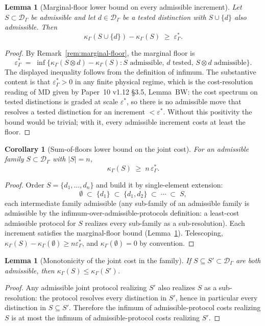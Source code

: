 \documentclass[11pt]{article}
\newtheorem{lemma}[theorem]{Lemma}
\newtheorem{corollary}[theorem]{Corollary}
\begin{document}
\begin{lemma}[Marginal-floor lower bound on every admissible increment]
\label{lem:marginal-floor-on-joint-cost}
Let $S\subset\mathcal D_\Gamma$ be admissible and let $d\in\mathcal D_\Gamma$ be a tested distinction with $S\cup\{d\}$ also admissible.  Then
\[
    \kappa_\Gamma(S\cup\{d\}) - \kappa_\Gamma(S)
    \;\ge\;
    \varepsilon^*_\Gamma.
\]
\end{lemma}
\begin{proof}
By Remark~\ref{rem:marginal-floor}, the marginal floor is
\[
    \varepsilon^*_\Gamma
    \;=\;
    \inf\bigl\{\kappa_\Gamma(S\otimes d) - \kappa_\Gamma(S) :
            S \text{ admissible},\, d \text{ tested},\,
            S\otimes d \text{ admissible}\bigr\}.
\]
The displayed inequality follows from the definition of infimum.  The substantive content is that $\varepsilon^*_\Gamma > 0$ in any finite physical regime, which is the cost-resolution reading of MD given by Paper~10 v1.12 \S3.5, Lemma~BW: the cost spectrum on tested distinctions is graded at scale $\varepsilon^*$, so there is no admissible move that resolves a tested distinction for an increment $< \varepsilon^*$.  Without this positivity the bound would be trivial; with it, every admissible increment costs at least the floor.
\end{proof}

\begin{corollary}[Sum-of-floors lower bound on the joint cost]
\label{cor:sum-of-floors-lower-bound}
For an admissible family $S\subset\mathcal D_\Gamma$ with $|S|=n$,
\[
    \kappa_\Gamma(S) \;\ge\; n\,\varepsilon^*_\Gamma.
\]
\end{corollary}
\begin{proof}
Order $S=\{d_1,\ldots,d_n\}$ and build it by single-element extension:
\[
    \emptyset \;\subset\; \{d_1\} \;\subset\; \{d_1,d_2\} \;\subset\; \cdots \;\subset\; S,
\]
each intermediate family admissible (any sub-family of an admissible family is admissible by the infimum-over-admissible-protocols definition: a least-cost admissible protocol for $S$ realizes every sub-family as a sub-resolution).  Each increment satisfies the marginal-floor bound (Lemma~\ref{lem:marginal-floor-on-joint-cost}).  Telescoping, $\kappa_\Gamma(S) - \kappa_\Gamma(\emptyset) \ge n\varepsilon^*_\Gamma$, and $\kappa_\Gamma(\emptyset)=0$ by convention.
\end{proof}

\begin{lemma}[Monotonicity of the joint cost in the family]
\label{lem:joint-cost-monotonicity-in-S}
If $S\subseteq S'\subset\mathcal D_\Gamma$ are both admissible, then $\kappa_\Gamma(S)\le\kappa_\Gamma(S')$.
\end{lemma}
\begin{proof}
Any admissible joint protocol realizing $S'$ also realizes $S$ as a sub-resolution: the protocol resolves every distinction in $S'$, hence in particular every distinction in $S\subseteq S'$.  Therefore the infimum of admissible-protocol costs realizing $S$ is at most the infimum of admissible-protocol costs realizing $S'$.
\end{proof}
\end{document}
